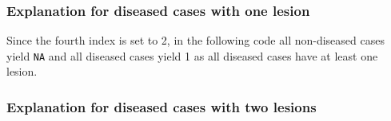 \documentclass[
]{book}
\newenvironment{Shaded}{\begin{snugshade}}{\end{snugshade}}
\newcommand{\CommentTok}[1]{\textcolor[rgb]{0.56,0.35,0.01}{\textit{#1}}}
\newcommand{\DecValTok}[1]{\textcolor[rgb]{0.00,0.00,0.81}{#1}}
\newcommand{\FunctionTok}[1]{\textcolor[rgb]{0.00,0.00,0.00}{#1}}
\newcommand{\NormalTok}[1]{#1}
\newcommand{\SpecialCharTok}[1]{\textcolor[rgb]{0.00,0.00,0.00}{#1}}
\begin{document}
\begin{Shaded}
\end{Shaded}

\hypertarget{explanation-for-diseased-cases-with-one-lesion}{%
\subsubsection{Explanation for diseased cases with one lesion}\label{explanation-for-diseased-cases-with-one-lesion}}

Since the fourth index is set to 2, in the following code all non-diseased cases yield \texttt{NA} and all diseased cases yield 1 as all diseased cases have at least one lesion.

\begin{Shaded}
\end{Shaded}

\hypertarget{explanation-for-diseased-cases-with-two-lesions}{%
\subsubsection{Explanation for diseased cases with two lesions}\label{explanation-for-diseased-cases-with-two-lesions}}
\end{document}
